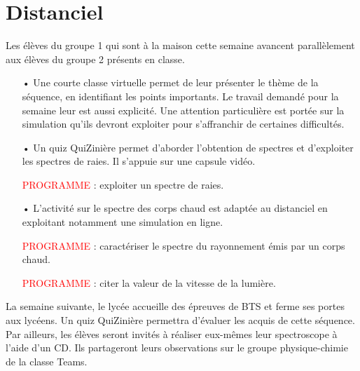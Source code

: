\documentclass[12pt,a4paper,fleqn]{article}
\newcommand{\prog}{\textcolor{red}{PROGRAMME}}
\begin{document}
\newpage
\section*{Distanciel}

Les élèves du groupe 1 qui sont à la maison cette semaine avancent parallèlement aux élèves du groupe 2 présents en classe.
\begin{itemize}
\item[•] Une courte classe virtuelle permet de leur présenter le thème de la séquence, en identifiant les points importants.
Le travail demandé pour la semaine leur est aussi explicité.
Une attention particulière est portée sur la simulation qu'ils devront exploiter pour s'affranchir de certaines difficultés. 

\item[•] Un quiz QuiZinière permet d'aborder l'obtention de spectres et d'exploiter les spectres de raies.
Il s'appuie sur une capsule vidéo.

\prog{} : exploiter un spectre de raies.

\item[•] L'activité sur le spectre des corps chaud est adaptée au distanciel en exploitant notamment une simulation en ligne.

\prog{} : caractériser le spectre du rayonnement émis par un corps chaud.

\prog{} : citer la valeur de la vitesse de la lumière.
\end{itemize}

La semaine suivante, le lycée accueille des épreuves de BTS et ferme ses portes aux lycéens.
Un quiz QuiZinière permettra d'évaluer les acquis de cette séquence.
Par ailleurs, les élèves seront invités à réaliser eux-mêmes leur spectroscope à l'aide d'un CD.
Ils partageront leurs observations sur le groupe physique-chimie de la classe Teams.







\end{document}
